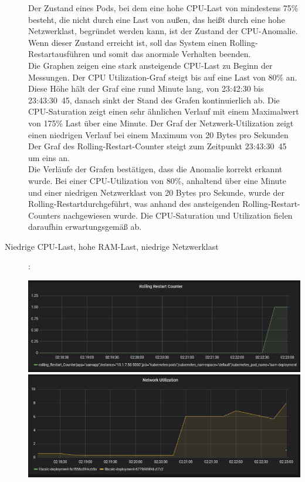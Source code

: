 \documentclass[a4paper,10pt]{scrartcl}
\begin{document}
\begin{description}
Der Zustand eines Pods, bei dem eine hohe CPU-Last von mindestens 75\% besteht, die nicht durch eine Last von außen, das heißt durch eine hohe Netzwerklast, begründet werden kann, ist der Zustand der CPU-Anomalie. Wenn dieser Zustand erreicht ist, soll das System einen \glqq Rolling-Restart\grqq ausführen und somit das anormale Verhalten beenden.\\
Die Graphen zeigen eine stark ansteigende CPU-Last zu Beginn der Messungen. Der CPU Utilization-Graf steigt bis auf eine Last von 80\% an. Diese Höhe hält der Graf eine rund Minute lang, von 23:42:30 bis 23:43:30~45, danach sinkt der Stand des Grafen kontinuierlich ab. Die CPU-Saturation zeigt einen sehr ähnlichen Verlauf mit einem Maximalwert von 175\% Last über eine Minute. Der Graf der Netzwerk-Utilization zeigt einen niedrigen Verlauf bei einem Maximum von 20 Bytes pro Sekunden\\
Der Graf des \glqq Rolling-Restart\grqq -Counter steigt zum Zeitpunkt 23:43:30~45 um eins an.\\
Die Verläufe der Grafen bestätigen, dass die Anomalie korrekt erkannt wurde. Bei einer CPU-Utilization von 80\%, anhaltend über eine Minute und einer niedrigen Netzwerklast von 20 Bytes pro Sekunde, wurde der \glqq Rolling-Restart\grqq durchgeführt, was anhand des ansteigenden \glqq Rolling-Restart\grqq -Counters nachgewiesen wurde. Die CPU-Saturation und Utilization fielen daraufhin erwartungsgemäß ab.

\pagebreak

\item[Niedrige CPU-Last, hohe RAM-Last, niedrige Netzwerklast]:\\

\begin{minipage}{\linewidth}
            \includegraphics[width=1\textwidth]{img/RAMAnomalie/RollingRestart.PNG}\\
            
            \includegraphics[width=1\textwidth]{img/RAMAnomalie/Netzwerk.PNG}\\
            

\end{minipage}
\end{description}
\end{document}
